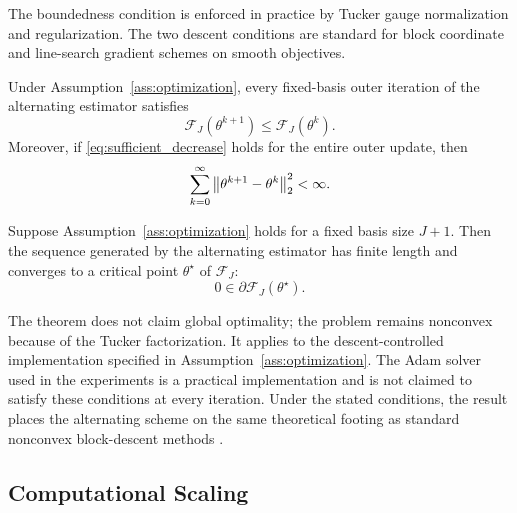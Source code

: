 The boundedness condition is enforced in practice by Tucker gauge
normalization and regularization. The two descent conditions are standard for
block coordinate and line-search gradient schemes on smooth objectives.

\begin{proposition}
\label{prop:monotone_descent}
Under Assumption~\ref{ass:optimization}, every fixed-basis outer iteration of
the alternating estimator satisfies
\begin{equation}
  \mathcal{F}_J(\theta^{k+1})\le \mathcal{F}_J(\theta^k).
\end{equation}
Moreover, if \eqref{eq:sufficient_decrease} holds for the entire outer update,
then
\begin{equation}
  \sum_{k=0}^{\infty}
  \left\lVert \theta^{k+1}-\theta^k \right\rVert_2^2
  <\infty .
\end{equation}
\end{proposition}

\begin{theorem}
\label{thm:stationary_convergence}
Suppose Assumption~\ref{ass:optimization} holds for a fixed basis size
$J+1$. Then
the sequence generated by the alternating estimator has finite length and
converges to a critical point $\theta^\star$ of $\mathcal{F}_J$:
\begin{equation}
  0\in \partial \mathcal{F}_J(\theta^\star).
\end{equation}
\end{theorem}

The theorem does not claim global optimality; the problem remains nonconvex
because of the Tucker factorization. It applies to the descent-controlled
implementation specified in Assumption~\ref{ass:optimization}. The Adam solver
used in the experiments is a practical implementation and is not claimed to
satisfy these conditions at every iteration. Under the stated conditions, the
result places the alternating scheme on the same theoretical footing as standard
nonconvex block-descent methods
\cite{Attouch2013Convergence,Bolte2014PALM}.

\subsection{Computational Scaling}

